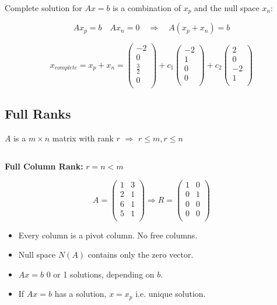 \documentclass[12pt]{article}
\begin{document}
Complete solution for $Ax=b$ is a combination of $x_p$ and the null space $x_n$:

\[
Ax_p=b
\quad
Ax_n=0
\quad
\Rightarrow
\quad
A(x_p+x_n)=b
\]

\[
x_{complete}=
x_p + x_n = 
\left(
    \begin{matrix}
        -2\\
        0\\
        \frac{3}{2}\\
        0\\
    \end{matrix}
\right)
+c_1
\left(
    \begin{matrix}
        -2\\
        1\\
        0\\
        0\\
    \end{matrix}
\right)
+c_2
\left(
    \begin{matrix}
        2\\
        0\\
        -2\\
        1\\
    \end{matrix}
\right)
\]

\subsection{Full Ranks}

$A$ is a $m\times{n}$ matrix with rank $r$ $\Rightarrow$ $r\leq{m},r\leq{n}$

$\>$

\textbf{Full Column Rank:} $r=n<m$

\[
A=
\left(
    \begin{matrix}
        1 & 3\\
        2 & 1\\
        6 & 1\\
        5 & 1\\
    \end{matrix}
\right)
\Rightarrow
R=
\left(
    \begin{matrix}
        1 & 0\\
        0 & 1\\
        0 & 0\\
        0 & 0\\
    \end{matrix}
\right)
\]

\begin{itemize}
    \item Every column is a pivot column. No free columns.
    \item Null space $N(A)$ contains only the zero vector.
    \item $Ax=b$ 0 or 1 solutions, depending on $b$.
    \item If $Ax=b$ has a solution, $x=x_p$ i.e. unique solution.
\end{itemize}
\end{document}

